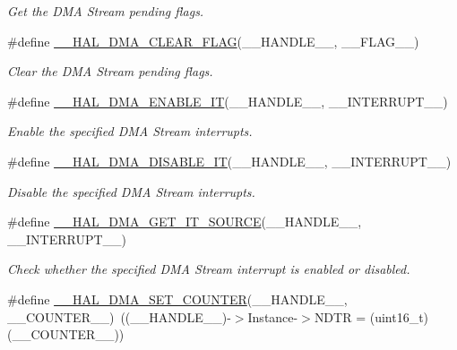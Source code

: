 \begin{DoxyCompactItemize}
\begin{DoxyCompactList}\small\item\em Get the D\+MA Stream pending flags. \end{DoxyCompactList}\item 
\#define \mbox{\hyperlink{group___d_m_a_gabc041fb1c85ea7a3af94e42470ef7f2a}{\+\_\+\+\_\+\+H\+A\+L\+\_\+\+D\+M\+A\+\_\+\+C\+L\+E\+A\+R\+\_\+\+F\+L\+AG}}(\+\_\+\+\_\+\+H\+A\+N\+D\+L\+E\+\_\+\+\_\+,  \+\_\+\+\_\+\+F\+L\+A\+G\+\_\+\+\_\+)
\begin{DoxyCompactList}\small\item\em Clear the D\+MA Stream pending flags. \end{DoxyCompactList}\item 
\#define \mbox{\hyperlink{group___d_m_a_ga2124233229c04ca90b790cd8cddfa98b}{\+\_\+\+\_\+\+H\+A\+L\+\_\+\+D\+M\+A\+\_\+\+E\+N\+A\+B\+L\+E\+\_\+\+IT}}(\+\_\+\+\_\+\+H\+A\+N\+D\+L\+E\+\_\+\+\_\+,  \+\_\+\+\_\+\+I\+N\+T\+E\+R\+R\+U\+P\+T\+\_\+\+\_\+)
\begin{DoxyCompactList}\small\item\em Enable the specified D\+MA Stream interrupts. \end{DoxyCompactList}\item 
\#define \mbox{\hyperlink{group___d_m_a_ga2867eab09398df2daac55c3f327654da}{\+\_\+\+\_\+\+H\+A\+L\+\_\+\+D\+M\+A\+\_\+\+D\+I\+S\+A\+B\+L\+E\+\_\+\+IT}}(\+\_\+\+\_\+\+H\+A\+N\+D\+L\+E\+\_\+\+\_\+,  \+\_\+\+\_\+\+I\+N\+T\+E\+R\+R\+U\+P\+T\+\_\+\+\_\+)
\begin{DoxyCompactList}\small\item\em Disable the specified D\+MA Stream interrupts. \end{DoxyCompactList}\item 
\#define \mbox{\hyperlink{group___d_m_a_ga206f24e6bee4600515b9b6b1ec79365b}{\+\_\+\+\_\+\+H\+A\+L\+\_\+\+D\+M\+A\+\_\+\+G\+E\+T\+\_\+\+I\+T\+\_\+\+S\+O\+U\+R\+CE}}(\+\_\+\+\_\+\+H\+A\+N\+D\+L\+E\+\_\+\+\_\+,  \+\_\+\+\_\+\+I\+N\+T\+E\+R\+R\+U\+P\+T\+\_\+\+\_\+)
\begin{DoxyCompactList}\small\item\em Check whether the specified D\+MA Stream interrupt is enabled or disabled. \end{DoxyCompactList}\item 
\#define \mbox{\hyperlink{group___d_m_a_ga448a8f809df86ccffae200ffd33d0a82}{\+\_\+\+\_\+\+H\+A\+L\+\_\+\+D\+M\+A\+\_\+\+S\+E\+T\+\_\+\+C\+O\+U\+N\+T\+ER}}(\+\_\+\+\_\+\+H\+A\+N\+D\+L\+E\+\_\+\+\_\+,  \+\_\+\+\_\+\+C\+O\+U\+N\+T\+E\+R\+\_\+\+\_\+)~((\+\_\+\+\_\+\+H\+A\+N\+D\+L\+E\+\_\+\+\_\+)-\/$>$Instance-\/$>$N\+D\+TR = (uint16\+\_\+t)(\+\_\+\+\_\+\+C\+O\+U\+N\+T\+E\+R\+\_\+\+\_\+))

\end{DoxyCompactItemize}
